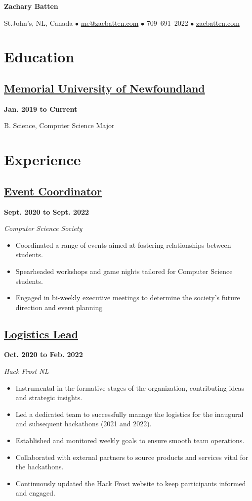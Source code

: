 \documentclass[12pt]{extarticle}
\begin{document}
\begin{center}
\textbf{\huge{Zachary Batten}}

St.John's, NL, Canada
$\bullet$ \href{mailto:me@zacbatten.com}{me@zacbatten.com}
$\bullet$ 709--691--2022
$\bullet$ \href{https://zacbatten.com}{zacbatten.com}
\end{center}

\section*{Education}
\subsection*{\href{https://www.mun.ca/}{Memorial University of Newfoundland} 
}
\hfill \textbf{Jan. 2019 to Current}

B. Science, Computer Science Major

\section*{Experience}

\subsection*{\href{https://muncompsci.ca/}{Event Coordinator} 
}
\hfill \textbf{Sept. 2020 to Sept. 2022}

\textit{Computer Science Society}
\begin{itemize}
  \item Coordinated a range of events aimed at fostering relationships between students.
  \item Spearheaded workshops and game nights tailored for Computer Science students.
  \item Engaged in bi-weekly executive meetings to determine the society's future direction and event planning
\end{itemize}

\subsection*{\href{https://hackfrostnl.ca/}{Logistics Lead}
} \hfill \textbf{Oct. 2020 to Feb. 2022}

\textsl{Hack Frost NL}
\begin{itemize}
  \item Instrumental in the formative stages of the organization, contributing ideas and strategic insights.
  \item Led a dedicated team to successfully manage the logistics for the inaugural and subsequent hackathons (2021 and 2022).
  \item Established and monitored weekly goals to ensure smooth team operations.
  \item Collaborated with external partners to source products and services vital for the hackathons.
  \item Continuously updated the Hack Frost website to keep participants informed and engaged.
\end{itemize}
\end{document}
